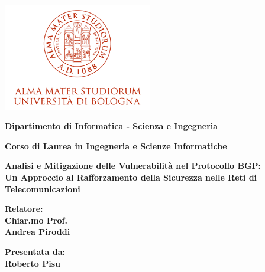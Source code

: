 \documentclass[12pt,a4paper,twoside]{book}
\begin{document}
\pagestyle{empty}

\begin{titlepage}

\begin{center}

\includegraphics[width=6.5cm,height=4.7cm]{img/marchio-di-ateneo.png}

\vspace{10mm}

{\large{\bf{Dipartimento di Informatica - Scienza e Ingegneria}}} 

\vspace{5mm}

{\Large{\bf{Corso di Laurea in Ingegneria e Scienze Informatiche}}}

\vspace{15mm}

{\Huge{\bf Analisi e Mitigazione delle Vulnerabilità nel Protocollo BGP: }\\
\vspace{3mm}
{\Huge{\bf  Un Approccio al Rafforzamento della Sicurezza nelle Reti di Telecomunicazioni}}\\
\vspace{3mm}}

\end{center}

\vspace{10mm}

\begin{minipage}[t]{0.40\textwidth}
{\Large{\bf Relatore: \\ Chiar.mo Prof.\\ Andrea Piroddi}}

\vspace{3mm}

\end{minipage}
\hfill
\begin{minipage}[t]{0.40\textwidth}\raggedleft
{\Large{\bf Presentata da: \\ Roberto Pisu}}
\end{minipage}


\end{titlepage}
\end{document}
